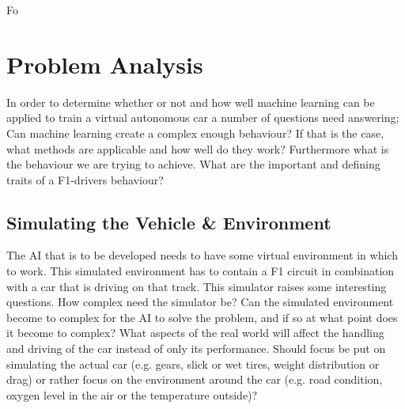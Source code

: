 Fo%


\chapter{Problem Analysis}
In order to determine whether or not and how well machine learning can be applied to train a virtual autonomous car a number of questions need answering; Can machine learning create a complex enough behaviour? If that is the case, what methods are applicable and how well do they work? Furthermore what is the behaviour we are trying to achieve. What are the important and defining traits of a F1-drivers behaviour? 

\section{Simulating the Vehicle \& Environment}
The AI that is to be developed needs to have some virtual environment in which to work. This simulated environment has to contain a F1 circuit in combination with a car that is driving on that track. This simulator raises some interesting questions. How complex need the simulator be? Can the simulated environment become to complex for the AI to solve the problem, and if so at what point does it become to complex? What aspects of the real world will affect the handling and driving of the car instead of only its performance. Should focus be put on simulating the actual car (e.g. gears, slick or wet tires, weight distribution or drag) or rather focus on the environment around the car (e.g. road condition, oxygen level in the air or the temperature outside)?

